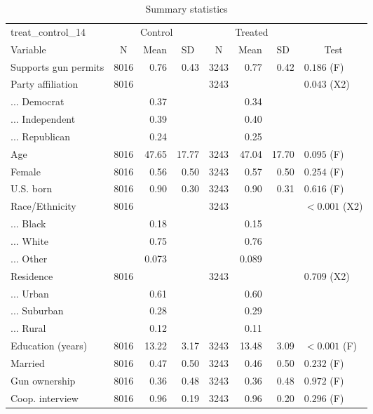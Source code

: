 \begin{table}[!htbp] \centering 
 \renewcommand*{\arraystretch}{1.1} 

\caption{Summary statistics}

\label{summary_tab}

\begin{tabular}{lrrrrrrl}
\hline
\hline
treat\_control\_14 & \multicolumn{3}{c}{Control} & \multicolumn{3}{c}{Treated} &   \\ 
 Variable & \multicolumn{1}{c}{N} & \multicolumn{1}{c}{Mean} & \multicolumn{1}{c}{SD} & \multicolumn{1}{c}{N} & \multicolumn{1}{c}{Mean} & \multicolumn{1}{c}{SD} & \multicolumn{1}{c}{Test} \\ 
\hline
Supports gun permits & 8016 & 0.76 & 0.43 & 3243 & 0.77 & 0.42 & $0.186$ (F) \\ 
Party affiliation & 8016 &  &  & 3243 &  &  & $0.043$ (X2) \\ 
... Democrat &  & 0.37 &  &  & 0.34 &  &  \\ 
... Independent &  & 0.39 &  &  & 0.40 &  &  \\ 
... Republican &  & 0.24 &  &  & 0.25 &  &  \\ 
Age & 8016 & 47.65 & 17.77 & 3243 & 47.04 & 17.70 & $0.095$ (F) \\ 
Female & 8016 & 0.56 & 0.50 & 3243 & 0.57 & 0.50 & $0.254$ (F) \\ 
U.S. born & 8016 & 0.90 & 0.30 & 3243 & 0.90 & 0.31 & $0.616$ (F) \\ 
Race/Ethnicity & 8016 &  &  & 3243 &  &  & $<0.001$ (X2) \\ 
... Black &  & 0.18 &  &  & 0.15 &  &  \\ 
... White &  & 0.75 &  &  & 0.76 &  &  \\ 
... Other &  & 0.073 &  &  & 0.089 &  &  \\ 
Residence & 8016 &  &  & 3243 &  &  & $0.709$ (X2) \\ 
... Urban &  & 0.61 &  &  & 0.60 &  &  \\ 
... Suburban &  & 0.28 &  &  & 0.29 &  &  \\ 
... Rural &  & 0.12 &  &  & 0.11 &  &  \\ 
Education (years) & 8016 & 13.22 & 3.17 & 3243 & 13.48 & 3.09 & $<0.001$ (F) \\ 
Married & 8016 & 0.47 & 0.50 & 3243 & 0.46 & 0.50 & $0.232$ (F) \\ 
Gun ownership & 8016 & 0.36 & 0.48 & 3243 & 0.36 & 0.48 & $0.972$ (F) \\ 
Coop. interview & 8016 & 0.96 & 0.19 & 3243 & 0.96 & 0.20 & $0.296$ (F)\\ 
\hline
\hline
\end{tabular}
\end{table}

